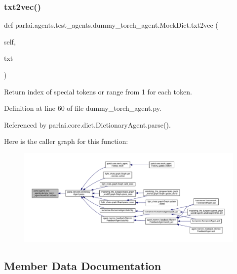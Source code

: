 \subsubsection{\texorpdfstring{txt2vec()}{txt2vec()}}
{\footnotesize\ttfamily def parlai.\+agents.\+test\+\_\+agents.\+dummy\+\_\+torch\+\_\+agent.\+Mock\+Dict.\+txt2vec (\begin{DoxyParamCaption}\item[{}]{self,  }\item[{}]{txt }\end{DoxyParamCaption})}

\begin{DoxyVerb}Return index of special tokens or range from 1 for each token.\end{DoxyVerb}
 

Definition at line 60 of file dummy\+\_\+torch\+\_\+agent.\+py.



Referenced by parlai.\+core.\+dict.\+Dictionary\+Agent.\+parse().

Here is the caller graph for this function\+:
\nopagebreak
\begin{figure}[H]
\begin{center}
\leavevmode
\includegraphics[width=350pt]{classparlai_1_1agents_1_1test__agents_1_1dummy__torch__agent_1_1MockDict_a390123aa7a8a16f5971a7dfbe261d353_icgraph}
\end{center}
\end{figure}


\subsection{Member Data Documentation}
\mbox{\label{classparlai_1_1agents_1_1test__agents_1_1dummy__torch__agent_1_1MockDict_a72d0bd92900466e4cbcdf217c5b4f498}} 
